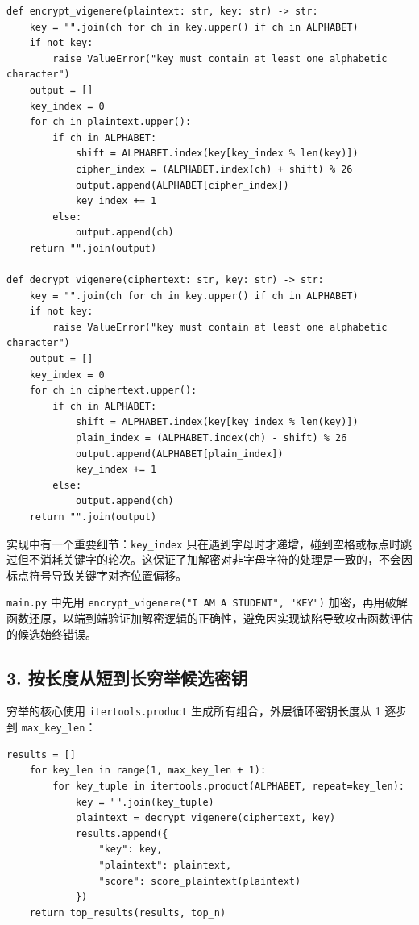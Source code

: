 \documentclass[12pt, a4paper]{article}
\begin{document}
\begin{lstlisting}[style=python, caption={维吉尼亚加解密函数（vigenere\_attack.py）}]
def encrypt_vigenere(plaintext: str, key: str) -> str:
    key = "".join(ch for ch in key.upper() if ch in ALPHABET)
    if not key:
        raise ValueError("key must contain at least one alphabetic character")
    output = []
    key_index = 0
    for ch in plaintext.upper():
        if ch in ALPHABET:
            shift = ALPHABET.index(key[key_index % len(key)])
            cipher_index = (ALPHABET.index(ch) + shift) % 26
            output.append(ALPHABET[cipher_index])
            key_index += 1
        else:
            output.append(ch)
    return "".join(output)

def decrypt_vigenere(ciphertext: str, key: str) -> str:
    key = "".join(ch for ch in key.upper() if ch in ALPHABET)
    if not key:
        raise ValueError("key must contain at least one alphabetic character")
    output = []
    key_index = 0
    for ch in ciphertext.upper():
        if ch in ALPHABET:
            shift = ALPHABET.index(key[key_index % len(key)])
            plain_index = (ALPHABET.index(ch) - shift) % 26
            output.append(ALPHABET[plain_index])
            key_index += 1
        else:
            output.append(ch)
    return "".join(output)
\end{lstlisting}

实现中有一个重要细节：\texttt{key\_index} 只在遇到字母时才递增，碰到空格或标点时跳过但不消耗关键字的轮次。这保证了加解密对非字母字符的处理是一致的，不会因标点符号导致关键字对齐位置偏移。

\texttt{main.py} 中先用 \texttt{encrypt\_vigenere("I AM A STUDENT", "KEY")} 加密，再用破解函数还原，以端到端验证加解密逻辑的正确性，避免因实现缺陷导致攻击函数评估的候选始终错误。

\subsection{3. 按长度从短到长穷举候选密钥}

穷举的核心使用 \texttt{itertools.product} 生成所有组合，外层循环密钥长度从 1 逐步到 \texttt{max\_key\_len}：

\begin{lstlisting}[style=python, caption={按长度穷举全部候选密钥（vigenere\_attack.py）}]
    results = []
    for key_len in range(1, max_key_len + 1):
        for key_tuple in itertools.product(ALPHABET, repeat=key_len):
            key = "".join(key_tuple)
            plaintext = decrypt_vigenere(ciphertext, key)
            results.append({
                "key": key,
                "plaintext": plaintext,
                "score": score_plaintext(plaintext)
            })
    return top_results(results, top_n)
\end{lstlisting}
\end{document}
